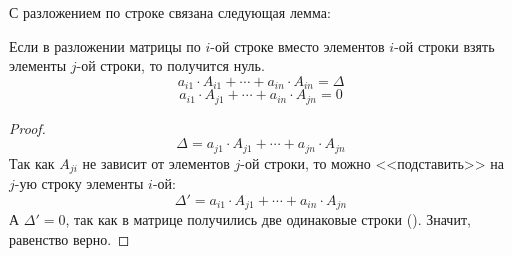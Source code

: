 
С разложением по строке связана следующая лемма:

\begin{lemma}
	\label{matrixdet:rowexpansion:replace}
	Если в разложении матрицы по $i$-ой строке вместо элементов $i$-ой
	строки взять элементы $j$-ой строки, то получится нуль.
	$$
	a_{i1}\cdot A_{i1}+\cdots+a_{in}\cdot A_{in}=\Delta
	$$ $$
	a_{i1}\cdot A_{j1}+\cdots+a_{in}\cdot A_{jn}=0
	$$
\end{lemma}
\begin{proof}
	$$\Delta =a_{j1}\cdot A_{j1}+\cdots+a_{jn}\cdot A_{jn}$$
	Так как $A_{ji}$ не зависит от элементов $j$-ой строки, то можно
	<<подставить>> на $j$-ую строку элементы $i$-ой:
	$$\Delta'=a_{i1}\cdot A_{j1}+\cdots+a_{in}\cdot A_{jn}$$
	А $\Delta'=0$, так как в матрице получились две одинаковые строки
	().
	Значит, равенство верно.
\end{proof}

